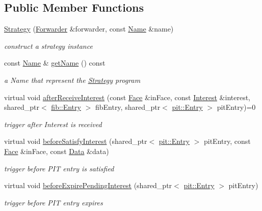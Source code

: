 \subsection*{Public Member Functions}
\begin{DoxyCompactItemize}
\item 
\hyperlink{classnfd_1_1fw_1_1Strategy_a99a8c25a083cb065126f6bb207e35939}{Strategy} (\hyperlink{classnfd_1_1Forwarder}{Forwarder} \&forwarder, const \hyperlink{classndn_1_1Name}{Name} \&name)
\begin{DoxyCompactList}\small\item\em construct a strategy instance \end{DoxyCompactList}\item 
const \hyperlink{classndn_1_1Name}{Name} \& \hyperlink{classnfd_1_1fw_1_1Strategy_a91bdb8a1aeb6f5100db0384aa2c2d6d8}{get\+Name} () const\hypertarget{classnfd_1_1fw_1_1Strategy_a91bdb8a1aeb6f5100db0384aa2c2d6d8}{}\label{classnfd_1_1fw_1_1Strategy_a91bdb8a1aeb6f5100db0384aa2c2d6d8}

\begin{DoxyCompactList}\small\item\em a Name that represent the \hyperlink{classnfd_1_1fw_1_1Strategy}{Strategy} program \end{DoxyCompactList}\item 
virtual void \hyperlink{classnfd_1_1fw_1_1Strategy_a1193c1881f92b1618a1004f92669eaaa}{after\+Receive\+Interest} (const \hyperlink{classnfd_1_1Face}{Face} \&in\+Face, const \hyperlink{classndn_1_1Interest}{Interest} \&interest, shared\+\_\+ptr$<$ \hyperlink{classnfd_1_1fib_1_1Entry}{fib\+::\+Entry} $>$ fib\+Entry, shared\+\_\+ptr$<$ \hyperlink{classnfd_1_1pit_1_1Entry}{pit\+::\+Entry} $>$ pit\+Entry)=0
\begin{DoxyCompactList}\small\item\em trigger after Interest is received \end{DoxyCompactList}\item 
virtual void \hyperlink{classnfd_1_1fw_1_1Strategy_a31387ec5c8204841e407bced9902c203}{before\+Satisfy\+Interest} (shared\+\_\+ptr$<$ \hyperlink{classnfd_1_1pit_1_1Entry}{pit\+::\+Entry} $>$ pit\+Entry, const \hyperlink{classnfd_1_1Face}{Face} \&in\+Face, const \hyperlink{classndn_1_1Data}{Data} \&data)
\begin{DoxyCompactList}\small\item\em trigger before P\+IT entry is satisfied \end{DoxyCompactList}\item 
virtual void \hyperlink{classnfd_1_1fw_1_1Strategy_a16f330a517d2df19a80c4b74e8685b28}{before\+Expire\+Pending\+Interest} (shared\+\_\+ptr$<$ \hyperlink{classnfd_1_1pit_1_1Entry}{pit\+::\+Entry} $>$ pit\+Entry)
\begin{DoxyCompactList}\small\item\em trigger before P\+IT entry expires \end{DoxyCompactList}\end{DoxyCompactItemize}
